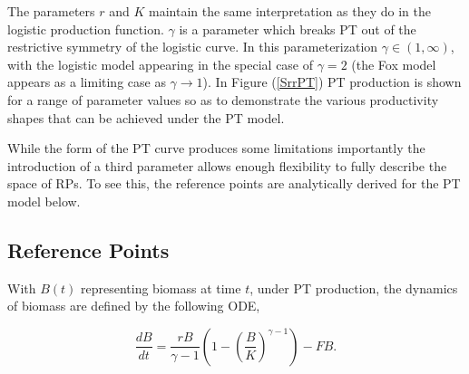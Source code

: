 
%
The parameters $r$ and $K$ maintain the same interpretation as 
they do in the logistic production function. 
%
$\gamma$ is a parameter which breaks PT out of the restrictive symmetry of the
logistic curve. In this parameterization $\gamma\in(1, \infty)$, with the logistic model
appearing in the special case of $\gamma=2$ (the Fox model \cite{fox_jr_exponential_1970} 
appears as a limiting case as $\gamma\to1$). 
%
%
In Figure (\ref{SrrPT}) PT production is shown for a range of parameter values
so as to demonstrate the various productivity shapes that can be achieved under
the PT model.

%
While the form of the PT curve produces some limitations \cite{punt_extending_2019, fletcher_restructuring_1978} %
importantly the %
introduction of a third parameter allows enough flexibility to fully describe
the space of RPs. %
To see this, the reference points are analytically derived for the PT model below. %

%
\subsection{Reference Points}\label{ptRef}
%
With $B(t)$ representing biomass at time $t$, under PT production, the
dynamics of biomass are defined by the following ODE,

\begin{equation}
\frac{dB}{dt} = \frac{r B}{\gamma-1} \left(1-\left(\frac{B}{K}\right)^{\gamma-1}\right) - FB. \label{dBdtPT}
\end{equation}

